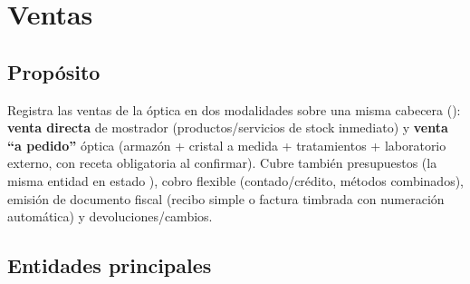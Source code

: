 \chapter{Ventas}
\label{mod:08-ventas}

\section{Propósito}
\label{sec:08-proposito}

Registra las ventas de la óptica en dos modalidades sobre una misma cabecera (): \textbf{venta directa} de mostrador (productos/servicios de stock inmediato) y \textbf{venta ``a pedido''} óptica (armazón + cristal a medida + tratamientos + laboratorio externo, con receta obligatoria al confirmar). Cubre también presupuestos (la misma entidad  en estado ), cobro flexible (contado/crédito, métodos combinados), emisión de documento fiscal (recibo simple o factura timbrada con numeración automática) y devoluciones/cambios.

\section{Entidades principales}
\label{sec:08-entidades}

